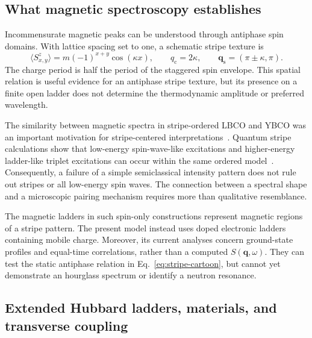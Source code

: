\documentclass[11pt,letterpaper]{article}
\newcommand{\avg}[1]{\langle #1\rangle}
\begin{document}
\subsection{What magnetic spectroscopy establishes}

Incommensurate magnetic peaks can be understood through antiphase spin
domains. With lattice spacing set to one, a schematic stripe texture is
\begin{equation}
 \avg{S^z_{x,y}}=m(-1)^{x+y}\cos(\kappa x),
 \qquad q_{\mathrm c}=2\kappa,\qquad
 \mathbf q_{\mathrm s}=(\pi\pm\kappa,\pi).
 \label{eq:stripe-cartoon}
\end{equation}
The charge period is half the period of the staggered spin envelope. This
spatial relation is useful evidence for an antiphase stripe texture, but its
presence on a finite open ladder does not determine the thermodynamic
amplitude or preferred wavelength.

The similarity between magnetic spectra in stripe-ordered LBCO and YBCO was
an important motivation for stripe-centered
interpretations~\citep{Tranquada2004}. Quantum stripe calculations show that
low-energy spin-wave-like excitations and higher-energy ladder-like triplet
excitations can occur within the same ordered model~\citep{Vojta2004}.
Consequently, a failure of a simple semiclassical intensity pattern does not
rule out stripes or all low-energy spin waves. The connection between a
spectral shape and a microscopic pairing mechanism requires more than
qualitative resemblance.

The magnetic ladders in such spin-only constructions represent magnetic
regions of a stripe pattern. The present model instead uses doped electronic
ladders containing mobile charge. Moreover, its current analyses concern
ground-state profiles and equal-time correlations, rather than a computed
$S(\mathbf q,\omega)$. They can test the static antiphase relation in
Eq.~\eqref{eq:stripe-cartoon}, but cannot yet demonstrate an hourglass
spectrum or identify a neutron resonance.

\subsection{Extended Hubbard ladders, materials, and transverse coupling}
\label{sec:ladder-materials}
\end{document}
